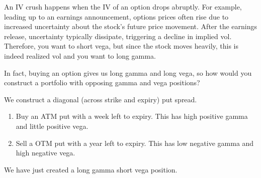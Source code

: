 \documentclass{article}
\begin{document}
    \begin{example}[IV Crush]
      An IV crush happens when the IV of an option drops abruptly. For example, leading up to an earnings announcement, options prices often rise due to increased uncertainty about the stock's future price movement. After the earnings release, uncertainty typically dissipate, triggering a decline in implied vol. Therefore, you want to short vega, but since the stock moves heavily, this is indeed realized vol and you want to long gamma.
    \end{example}


    In fact, buying an option gives us long gamma and long vega, so how would you construct a portfolio with opposing gamma and vega positions?

    \begin{example}
      We construct a diagonal (across strike and expiry) put spread.
      \begin{enumerate}
        \item Buy an ATM put with a week left to expiry. This has high positive gamma and little positive vega.
        \item Sell a OTM put with a year left to expiry. This has low negative gamma and high negative vega.
      \end{enumerate}
      We have just created a long gamma short vega position.
    \end{example}
\end{document}
